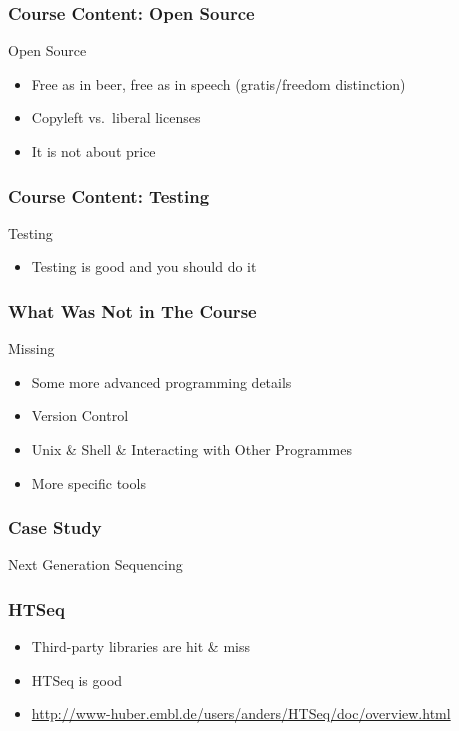 \begin{frame}[fragile]
\frametitle{Course Content: Open Source}
\begin{block}{Open Source}
\begin{itemize}
\item Free as in beer, free as in speech (gratis/freedom distinction)
\item Copyleft vs.\ liberal licenses
\item It is not about price
\end{itemize}
\end{block}
\end{frame}

\begin{frame}[fragile]
\frametitle{Course Content: Testing}
\begin{block}{Testing}
\begin{itemize}
\item Testing is good and you should do it
\end{itemize}
\end{block}
\end{frame}

\begin{frame}[fragile]
\frametitle{What Was Not in The Course}
\begin{block}{Missing}
\begin{itemize}
\item Some more advanced programming details
\item Version Control
\item Unix \& Shell \& Interacting with Other Programmes
\item More specific tools
\end{itemize}
\end{block}

\end{frame}


\begin{frame}[fragile]
\frametitle{Case Study}

\bigskip
\bigskip
\bigskip
Next Generation Sequencing

\end{frame}


\begin{frame}[fragile]
\frametitle{HTSeq}

\begin{itemize}
\item Third-party libraries are hit \& miss
\item HTSeq is good
\item \url{http://www-huber.embl.de/users/anders/HTSeq/doc/overview.html}
\end{itemize}

\end{frame}

